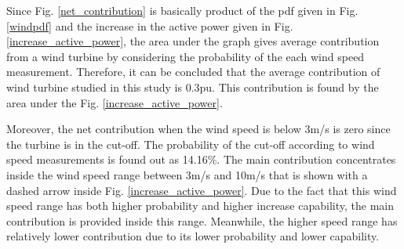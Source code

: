 Since Fig. \ref{net_contribution} is basically product of the pdf given in Fig. \ref{windpdf} and the increase in the active power given in Fig. \ref{increase_active_power}, the area under the graph gives average contribution from a wind turbine by considering the probability of the each wind speed measurement. Therefore, it can be concluded that the average contribution of wind turbine studied in this study is 0.3pu. This contribution is found by the area under the Fig. \ref{increase_active_power}.\par
Moreover, the net contribution when the wind speed is below 3m/s is zero since the turbine is in the cut-off. The probability of the cut-off according to wind speed measurements is found out as 14.16\%. The main contribution concentrates inside the wind speed range between 3m/s and 10m/s that is shown with a dashed arrow inside Fig. \ref{increase_active_power}. Due to the fact that this wind speed range has both higher probability and higher increase capability, the main contribution is provided inside this range. Meanwhile, the higher speed range has relatively lower contribution due to its lower probability and lower capability. \par

